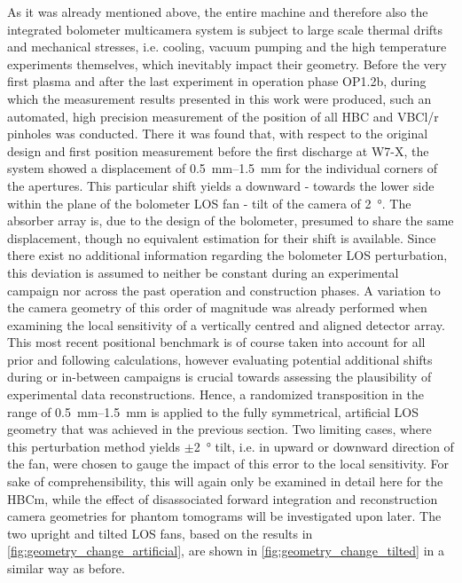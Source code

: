            As it was already mentioned above, the entire machine and therefore also the integrated bolometer multicamera system is subject to large scale thermal drifts and mechanical stresses, i.e. cooling, vacuum pumping and the high temperature experiments themselves, which inevitably impact their geometry. Before the very first plasma and after the last experiment in operation phase OP1.2b, during which the measurement results presented in this work were produced, such an automated, high precision measurement of the position of all HBC and VBCl/r pinholes was conducted. There it was found that, with respect to the original design and first position measurement before the first discharge at W7-X, the system showed a displacement of \SIrange{0.5}{1.5}{\milli\meter} for the individual corners of the apertures. This particular shift yields a downward - towards the lower side within the plane of the bolometer LOS fan - tilt of the camera of \SI{2}{\degree}. The absorber array is, due to the design of the bolometer, presumed to share the same displacement, though no equivalent estimation for their shift is available. Since there exist no additional information regarding the bolometer LOS perturbation, this deviation is assumed to neither be constant during an experimental campaign nor across the past operation and construction phases. A variation to the camera geometry of this order of magnitude was already performed when examining the local sensitivity of a vertically centred and aligned detector array. This most recent positional benchmark is of course taken into account for all prior and following calculations, however evaluating potential additional shifts during or in-between campaigns is crucial towards assessing the plausibility of experimental data reconstructions. Hence, a randomized transposition in the range of \SIrange{0.5}{1.5}{\milli\meter} is applied to the fully symmetrical, artificial LOS geometry that was achieved in the previous section. Two limiting cases, where this perturbation method yields $\pm$\SI{2}{\degree} tilt, i.e. in upward or downward direction of the fan, were chosen to gauge the impact of this error to the local sensitivity. For sake of comprehensibility, this will again only be examined in detail here for the HBCm, while the effect of disassociated forward integration and reconstruction camera geometries for phantom tomograms will be investigated upon later. The two upright and tilted LOS fans, based on the results in \cref{fig:geometry_change_artificial}, are shown in \cref{fig:geometry_change_tilted} in a similar way as before.\\%
